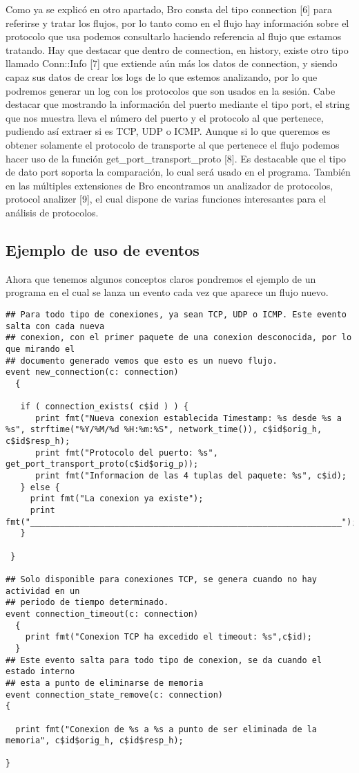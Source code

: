 Como ya se explicó en otro apartado, Bro consta del tipo connection [6] 
para referirse y tratar los flujos, por lo tanto como en el flujo hay 
información sobre el protocolo que usa podemos consultarlo haciendo 
referencia al flujo que estamos tratando. Hay que destacar que dentro 
de connection, en history, existe otro tipo llamado Conn::Info [7] que 
extiende aún más los datos de connection, y siendo capaz sus datos de 
crear los logs de lo que estemos analizando, por lo que podremos generar 
un log con los protocolos que son usados en la sesión. Cabe destacar que 
mostrando la información del puerto mediante el tipo port, el string que 
nos muestra lleva el número del puerto y el protocolo al que pertenece, 
pudiendo así extraer si es TCP, UDP o ICMP. Aunque si lo que queremos es 
obtener solamente el protocolo de transporte al que pertenece el flujo 
podemos hacer uso de la función get\_port\_transport\_proto [8].
\intro
Es destacable que el tipo de dato port soporta la comparación, lo cual 
será usado en el programa.  
\intro
También en las múltiples extensiones de Bro encontramos un analizador 
de protocolos, protocol analizer [9], el cual dispone de varias funciones 
interesantes para el análisis de protocolos.

\subsection{Ejemplo de uso de eventos}

Ahora que tenemos algunos conceptos claros pondremos el ejemplo de un 
programa en el cual se lanza un evento cada vez que aparece un flujo nuevo.
\intro
\pagebreak

\begin{verbatim}
## Para todo tipo de conexiones, ya sean TCP, UDP o ICMP. Este evento salta con cada nueva
## conexion, con el primer paquete de una conexion desconocida, por lo que mirando el
## documento generado vemos que esto es un nuevo flujo.
event new_connection(c: connection)
  {

   if ( connection_exists( c$id ) ) {
      print fmt("Nueva conexion establecida Timestamp: %s desde %s a %s", strftime("%Y/%M/%d %H:%m:%S", network_time()), c$id$orig_h, c$id$resp_h);
      print fmt("Protocolo del puerto: %s", get_port_transport_proto(c$id$orig_p));
      print fmt("Informacion de las 4 tuplas del paquete: %s", c$id);
   } else {
     print fmt("La conexion ya existe");
     print fmt("_______________________________________________________________");
   }

 }

## Solo disponible para conexiones TCP, se genera cuando no hay actividad en un
## periodo de tiempo determinado.
event connection_timeout(c: connection)
  {
    print fmt("Conexion TCP ha excedido el timeout: %s",c$id);
  }
## Este evento salta para todo tipo de conexion, se da cuando el estado interno
## esta a punto de eliminarse de memoria
event connection_state_remove(c: connection)
{

  print fmt("Conexion de %s a %s a punto de ser eliminada de la memoria", c$id$orig_h, c$id$resp_h);

}
\end{verbatim}

